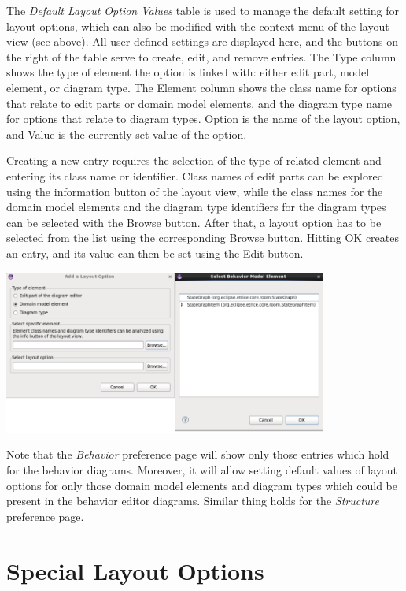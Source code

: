 The \textit{Default Layout Option Values} table is used to manage the default setting for layout options, which can also be modified with the context menu of the layout view (see above). All user-defined settings are displayed here, and the buttons on the right of the table serve to create, edit, and remove entries. The Type column shows the type of element the option is linked with: either edit part, model element, or diagram type. The Element column shows the class name for options that relate to edit parts or domain model elements, and the diagram type name for options that relate to diagram types. Option is the name of the layout option, and Value is the currently set value of the option.

Creating a new entry requires the selection of the type of related element and entering its class name or identifier. Class names of edit parts can be explored using the information button of the layout view, while the class names for the domain model elements and the diagram type identifiers for the diagram types can be selected with the Browse button. After that, a layout option has to be selected from the list using the corresponding Browse button. Hitting OK creates an entry, and its value can then be set using the Edit button.

\includegraphics[width=0.8\textwidth]{images/043-PreferencePage.png}

Note that the \textit{Behavior} preference page will show only those entries which hold for the behavior diagrams. Moreover, it will allow setting default values of layout options for only those domain model elements and diagram types which could be present in the behavior editor diagrams. Similar thing holds for the \textit{Structure} preference page.

\section{\label{specialOptions}Special Layout Options}

